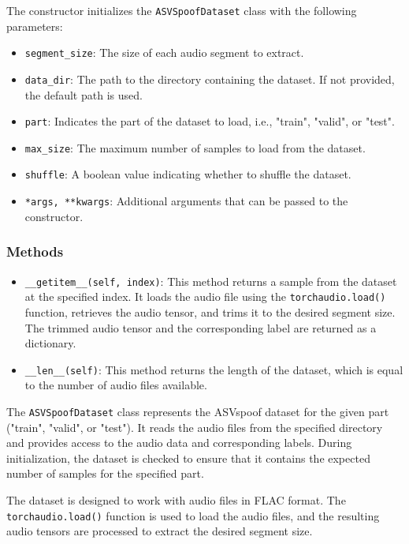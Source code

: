 \documentclass[a4paper]{article}
\begin{document}
The constructor initializes the \texttt{ASVSpoofDataset} class with the following parameters:

\begin{itemize}
    \item \texttt{segment\_size}: The size of each audio segment to extract.
    \item \texttt{data\_dir}: The path to the directory containing the dataset. If not provided, the default path is used.
    \item \texttt{part}: Indicates the part of the dataset to load, i.e., "train", "valid", or "test".
    \item \texttt{max\_size}: The maximum number of samples to load from the dataset.
    \item \texttt{shuffle}: A boolean value indicating whether to shuffle the dataset.
    \item \texttt{*args, **kwargs}: Additional arguments that can be passed to the constructor.
\end{itemize}

\subsubsection{Methods}

\begin{itemize}
    \item \texttt{\_\_getitem\_\_(self, index)}: This method returns a sample from the dataset at the specified index. It loads the audio file using the \texttt{torchaudio.load()} function, retrieves the audio tensor, and trims it to the desired segment size. The trimmed audio tensor and the corresponding label are returned as a dictionary.

    \item \texttt{\_\_len\_\_(self)}: This method returns the length of the dataset, which is equal to the number of audio files available.
\end{itemize}

The \texttt{ASVSpoofDataset} class represents the ASVspoof dataset for the given part ("train", "valid", or "test"). It reads the audio files from the specified directory and provides access to the audio data and corresponding labels. During initialization, the dataset is checked to ensure that it contains the expected number of samples for the specified part.

The dataset is designed to work with audio files in FLAC format. The \texttt{torchaudio.load()} function is used to load the audio files, and the resulting audio tensors are processed to extract the desired segment size.
\end{document}
